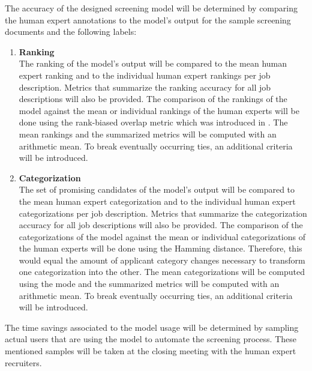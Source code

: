 \documentclass[draft,final]{thesisclass} %
\begin{document}
The accuracy of the designed screening model will be determined by comparing the human expert annotations to the model's output for the sample screening documents and the following labels:
\begin{enumerate}
    \item \textbf{Ranking}\\
    The ranking of the model's output will be compared to the mean human expert ranking and to the individual human expert rankings per job description.
    Metrics that summarize the ranking accuracy for all job descriptions will also be provided.
    The comparison of the rankings of the model against the mean or individual rankings of the human experts will be done using the rank-biased overlap metric which was introduced in \cite{rank_biased_overlap}. 
    The mean rankings and the summarized metrics will be computed with an arithmetic mean.
    To break eventually occurring ties, an additional criteria will be introduced.
    \item \textbf{Categorization}\\
    The set of promising candidates of the model's output will be compared to the mean human expert categorization and to the individual human expert categorizations per job description.
    Metrics that summarize the categorization accuracy for all job descriptions will also be provided.
    The comparison of the categorizations of the model against the mean or individual categorizations of the human experts will be done using the Hamming distance.
    Therefore, this would equal the amount of applicant category changes necessary to transform one categorization into the other.
    The mean categorizations will be computed using the mode and the summarized metrics will be computed with an arithmetic mean.
    To break eventually occurring ties, an additional criteria will be introduced.
\end{enumerate}

The time savings associated to the model usage will be determined by sampling actual users that are using the model to automate the screening process.
These mentioned samples will be taken at the closing meeting with the human expert recruiters.
\end{document}
